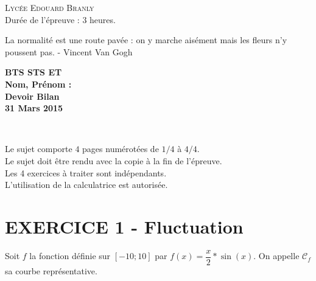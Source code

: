 \documentclass[12pt]{article}
\begin{document}
\setlength{\columnseprule}{0pt}

  \textsc{\LARGE Lycée Edouard Branly}\\[1.0cm] %
  {\huge Durée de l'épreuve : 3 heures.}\\[0.5cm]

\noindent\hrulefill

\begin{center}
  \textsf{La normalité est une route pavée : on y marche aisément mais les fleurs n'y poussent pas. - Vincent Van Gogh}\\
\end{center}

\noindent\hrulefill

\begin{minipage}[t]{\textwidth}
  \raggedright
      {\bfseries BTS STS ET}\\
      {\bfseries Nom, Prénom : }\\[.35ex]
      \vspace*{-1cm}
      \raggedleft
          {\bfseries Devoir Bilan}\\[.35ex]
          {\bfseries 31 Mars 2015}\\[.35ex]
\end{minipage}\\[1em]

\noindent\hrulefill

\noindent\hrulefill

  \begin{minipage}{\textwidth}
    \begin{flushright} 
      Le sujet comporte $4$  pages numérotées de   $1/4$   à  $4/4$.\\
      Le sujet doit être rendu avec la copie à la fin de l’épreuve.\\
      Les 4 exercices à traiter sont indépendants.\\
      L'utilisation de la calculatrice est autorisée.\\
    \end{flushright}
  \end{minipage}


\section*{EXERCICE 1 - Fluctuation}



Soit $f$ la fonction définie sur $[-10 ; 10]$ par $f(x) = \dfrac{x}{2} * \sin(x)$. On appelle $\mathcal{C}_f$ sa courbe représentative.
\end{document}
